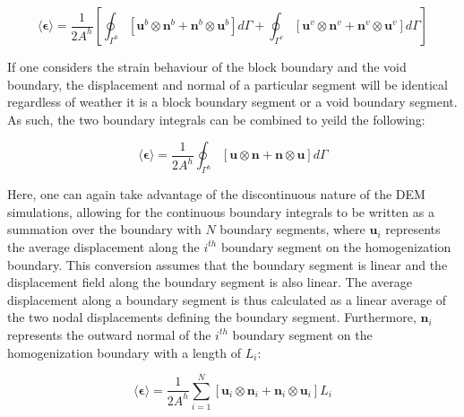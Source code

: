 \begin{equation}
\langle\boldsymbol{\epsilon}\rangle=\frac{1}{2A^{h}}\left[\oint_{\Gamma^{b}}\left[\mathbf{u}^{b}\otimes\mathbf{n}^{b}+\mathbf{n}^{b}\otimes\mathbf{u}^{b}\right]d\Gamma+\oint_{\Gamma^{v}}\left[\mathbf{u}^{v}\otimes\mathbf{n}^{v}+\mathbf{n}^{v}\otimes\mathbf{u}^{v}\right]d\Gamma\right]\label{eqn:strain5}
\end{equation}


If one considers the strain behaviour of the block boundary and the
void boundary, the displacement and normal of a particular segment
will be identical regardless of weather it is a block boundary segment
or a void boundary segment. As such, the two boundary integrals can
be combined to yeild the following:

\begin{equation}
\langle\boldsymbol{\epsilon}\rangle=\frac{1}{2A^{h}}\oint_{\Gamma^{h}}\left[\mathbf{u}\otimes\mathbf{n}+\mathbf{n}\otimes\mathbf{u}\right]d\Gamma\label{eqn:strain5-1}
\end{equation}


Here, one can again take advantage of the discontinuous nature of
the DEM simulations, allowing for the continuous boundary integrals
to be written as a summation over the boundary with $N$ boundary segments,
where $\mathbf{u}_{i}$ represents the average displacement along
the $i^{th}$ boundary segment on the homogenization boundary. This conversion assumes that the boundary segment is linear and the displacement field along the boundary segment is also linear. The
average displacement along a boundary segment is thus calculated as a linear
average of the two nodal displacements defining the boundary segment.
Furthermore, $\mathbf{n}_{i}$ represents the outward normal of
the $i^{th}$ boundary segment on the homogenization boundary with
a length of $L_{i}$:

\begin{equation}
\langle\boldsymbol{\epsilon}\rangle=\frac{1}{2A^{h}}\sum_{i=1}^{N}\left[\mathbf{u}_{i}\otimes\mathbf{n}_{i}+\mathbf{n}_{i}\otimes\mathbf{u}_{i}\right]L_{i}\label{eqn:strain7}
\end{equation}
